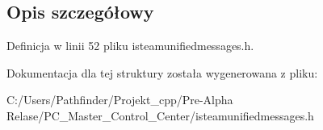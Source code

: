 \subsection{Opis szczegółowy}


Definicja w linii 52 pliku isteamunifiedmessages.\+h.



Dokumentacja dla tej struktury została wygenerowana z pliku\+:\begin{DoxyCompactItemize}
\item 
C\+:/\+Users/\+Pathfinder/\+Projekt\+\_\+cpp/\+Pre-\/\+Alpha Relase/\+P\+C\+\_\+\+Master\+\_\+\+Control\+\_\+\+Center/isteamunifiedmessages.\+h\end{DoxyCompactItemize}
